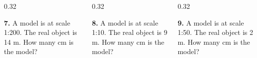 \documentclass[aspectratio=169,12pt]{beamer}
\newcommand{\MMProblem}[2]{\begin{MMProblemCard}\raggedright\small\textbf{#1.} #2\par\end{MMProblemCard}}
\begin{document}
\begin{frame}[t]
\begin{center}
\end{center}
\vspace{0.05em}
\begin{columns}[T,onlytextwidth]
\begin{column}{0.32\textwidth}\MMProblem{7}{A model is at scale 1:200. The real object is 14 m. How many cm is the model?}\end{column}
\begin{column}{0.32\textwidth}\MMProblem{8}{A model is at scale 1:10. The real object is 9 m. How many cm is the model?}\end{column}
\begin{column}{0.32\textwidth}\MMProblem{9}{A model is at scale 1:50. The real object is 2 m. How many cm is the model?}\end{column}
\end{columns}
\end{frame}
\end{document}
